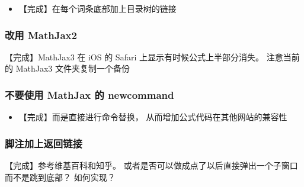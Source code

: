 \begin{itemize}
\item 【完成】在每个词条底部加上目录树的链接
\end{itemize}

\subsubsection{改用 MathJax2}
【完成】MathJax3 在 iOS 的 Safari 上显示有时候公式上半部分消失。 注意当前的 MathJax3 文件夹复制一个备份

\subsubsection{不要使用 MathJax 的 newcommand}
\begin{itemize}
\item 【完成】而是直接进行命令替换， 从而增加公式代码在其他网站的兼容性
\end{itemize}

\subsubsection{脚注加上返回链接}
【完成】参考维基百科和知乎。 或者是否可以做成点了以后直接弹出一个子窗口而不是跳到底部？ 如何实现？
